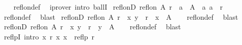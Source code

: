 \begin{isabellebody}
%
\isadelimproof
\ \ %
\endisadelimproof
%
\isatagproof
{}\isamarkupfalse%
\ refl{\isacharunderscore}{\kern0pt}on{\isacharunderscore}{\kern0pt}def\ \isamarkupfalse%
\ {\isacharparenleft}{\kern0pt}iprover\ intro{\isacharbang}{\kern0pt}{\isacharcolon}{\kern0pt}\ ballI{\isacharparenright}{\kern0pt}%
\endisatagproof
{\isafoldproof}%
%
\isadelimproof
\isanewline
%
\endisadelimproof
\isanewline
{}\isamarkupfalse%
\ refl{\isacharunderscore}{\kern0pt}onD{\isacharcolon}{\kern0pt}\ {\isachardoublequoteopen}refl{\isacharunderscore}{\kern0pt}on\ A\ r\ {\isasymLongrightarrow}\ a\ {\isasymin}\ A\ {\isasymLongrightarrow}\ {\isacharparenleft}{\kern0pt}a{\isacharcomma}{\kern0pt}\ a{\isacharparenright}{\kern0pt}\ {\isasymin}\ r{\isachardoublequoteclose}\isanewline
%
\isadelimproof
\ \ %
\endisadelimproof
%
\isatagproof
{}\isamarkupfalse%
\ refl{\isacharunderscore}{\kern0pt}on{\isacharunderscore}{\kern0pt}def\ \isamarkupfalse%
\ blast%
\endisatagproof
{\isafoldproof}%
%
\isadelimproof
\isanewline
%
\endisadelimproof
\isanewline
{}\isamarkupfalse%
\ refl{\isacharunderscore}{\kern0pt}onD{}{\isacharcolon}{\kern0pt}\ {\isachardoublequoteopen}refl{\isacharunderscore}{\kern0pt}on\ A\ r\ {\isasymLongrightarrow}\ {\isacharparenleft}{\kern0pt}x{\isacharcomma}{\kern0pt}\ y{\isacharparenright}{\kern0pt}\ {\isasymin}\ r\ {\isasymLongrightarrow}\ x\ {\isasymin}\ A{\isachardoublequoteclose}\isanewline
%
\isadelimproof
\ \ %
\endisadelimproof
%
\isatagproof
{}\isamarkupfalse%
\ refl{\isacharunderscore}{\kern0pt}on{\isacharunderscore}{\kern0pt}def\ \isamarkupfalse%
\ blast%
\endisatagproof
{\isafoldproof}%
%
\isadelimproof
\isanewline
%
\endisadelimproof
\isanewline
{}\isamarkupfalse%
\ refl{\isacharunderscore}{\kern0pt}onD{}{\isacharcolon}{\kern0pt}\ {\isachardoublequoteopen}refl{\isacharunderscore}{\kern0pt}on\ A\ r\ {\isasymLongrightarrow}\ {\isacharparenleft}{\kern0pt}x{\isacharcomma}{\kern0pt}\ y{\isacharparenright}{\kern0pt}\ {\isasymin}\ r\ {\isasymLongrightarrow}\ y\ {\isasymin}\ A{\isachardoublequoteclose}\isanewline
%
\isadelimproof
\ \ %
\endisadelimproof
%
\isatagproof
{}\isamarkupfalse%
\ refl{\isacharunderscore}{\kern0pt}on{\isacharunderscore}{\kern0pt}def\ \isamarkupfalse%
\ blast%
\endisatagproof
{\isafoldproof}%
%
\isadelimproof
\isanewline
%
\endisadelimproof
\isanewline
{}\isamarkupfalse%
\ reflpI\ {\isacharbrackleft}{\kern0pt}intro{\isacharquery}{\kern0pt}{\isacharbrackright}{\kern0pt}{\isacharcolon}{\kern0pt}\ {\isachardoublequoteopen}{\isacharparenleft}{\kern0pt}{\isasymAnd}x{\isachardot}{\kern0pt}\ r\ x\ x{\isacharparenright}{\kern0pt}\ {\isasymLongrightarrow}\ reflp\ r{\isachardoublequoteclose}\isanewline

\end{isabellebody}
